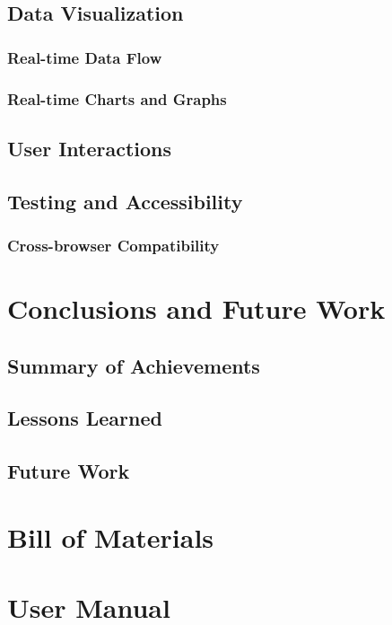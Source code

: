 \documentclass{article}
\begin{document}
\subsection{Data Visualization}
    \subsubsection{Real-time Data Flow}
    \subsubsection{Real-time Charts and Graphs}
\subsection{User Interactions}
\subsection{Testing and Accessibility}
    \subsubsection{Cross-browser Compatibility}

\section{Conclusions and Future Work}
    \subsection{Summary of Achievements}
    \subsection{Lessons Learned}
    \subsection{Future Work}

\appendix
\section{Bill of Materials}
\section{User Manual}
\end{document}
